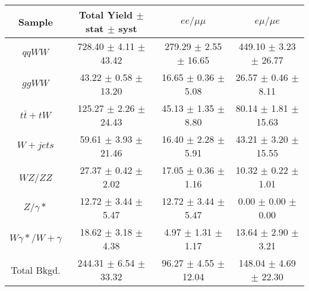 \begin{table}[ht!]
  \begin{center}
  \begin{tabular} {|c|c|c|c|}
\hline
Sample                & Total Yield $\pm$ stat $\pm$ syst & $ee/\mu\mu$  & $e\mu/\mu e$ \\ \hline \hline
$qqWW$                & 728.40 $\pm$ 4.11 $\pm$ 43.42   & 279.29 $\pm$ 2.55 $\pm$ 16.65   & 449.10 $\pm$ 3.23 $\pm$ 26.77 \\ \hline
$ggWW$                & 43.22 $\pm$ 0.58 $\pm$ 13.20   & 16.65 $\pm$ 0.36 $\pm$ 5.08   & 26.57 $\pm$ 0.46 $\pm$ 8.11 \\ \hline\hline
$t\bar{t} + tW$       & 125.27 $\pm$ 2.26 $\pm$ 24.43   & 45.13 $\pm$ 1.35 $\pm$ 8.80   & 80.14 $\pm$ 1.81 $\pm$ 15.63 \\ \hline
$W+jets$              & 59.61 $\pm$ 3.93 $\pm$ 21.46   & 16.40 $\pm$ 2.28 $\pm$ 5.91   & 43.21 $\pm$ 3.20 $\pm$ 15.55 \\ \hline
$WZ$/$ZZ$             & 27.37 $\pm$ 0.42 $\pm$ 2.02   & 17.05 $\pm$ 0.36 $\pm$ 1.16   & 10.32 $\pm$ 0.22 $\pm$ 1.01 \\ \hline
$Z/\gamma*$           & 12.72 $\pm$ 3.44 $\pm$ 5.47   & 12.72 $\pm$ 3.44 $\pm$ 5.47   & 0.00 $\pm$ 0.00 $\pm$ 0.00 \\ \hline
$W\gamma*/W+\gamma$   & 18.62 $\pm$ 3.18 $\pm$ 4.38   & 4.97 $\pm$ 1.31 $\pm$ 1.17   & 13.64 $\pm$ 2.90 $\pm$ 3.21 \\ \hline \hline
Total Bkgd.           & 244.31 $\pm$ 6.54 $\pm$ 33.32   & 96.27 $\pm$ 4.55 $\pm$ 12.04   & 148.04 $\pm$ 4.69 $\pm$ 22.30 \\ \hline \hline

\end{tabular}
\end{center}
\end{table}
